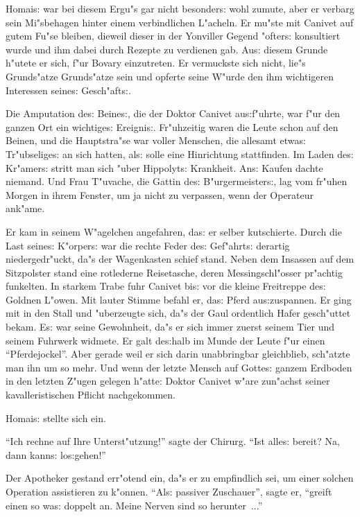 \documentclass[oneside,12pt]{book}
\newcommand{\s}{s:}%
\begin{document}
Homai{\s} war bei diesem Ergu"s gar nicht besonder{\s} wohl
zumute, aber er verbarg sein Mi"sbehagen hinter einem
verbindlichen L"acheln. Er mu"ste mit Canivet auf gutem Fu"se
bleiben, dieweil dieser in der Yonviller Gegend "ofter{\s}
konsultiert wurde und ihm dabei durch Rezepte zu verdienen gab.
Au{\s} diesem Grunde h"utete er sich, f"ur Bovary einzutreten. Er
vermuckste sich nicht, lie"s Grunds"atze Grunds"atze sein und
opferte seine W"urde den ihm wichtigeren Interessen seine{\s}
Gesch"aft{\s}.

Die Amputation de{\s} Beine{\s}, die der Doktor Canivet
au{\s}f"uhrte, war f"ur den ganzen Ort ein wichtige{\s}
Ereigni{\s}. Fr"uhzeitig waren die Leute schon auf den Beinen, und
die Hauptstra"se war voller Menschen, die allesamt etwa{\s}
Tr"ubselige{\s} an sich hatten, al{\s} solle eine Hinrichtung
stattfinden. Im Laden de{\s} Kr"amer{\s} stritt man sich "uber
Hippolyt{\s} Krankheit. An{\s} Kaufen dachte niemand. Und Frau
T"uvache, die Gattin de{\s} B"urgermeister{\s}, lag vom fr"uhen
Morgen in ihrem Fenster, um ja nicht zu verpassen, wenn der
Operateur ank"ame.

Er kam in seinem W"agelchen angefahren, da{\s} er selber
kutschierte. Durch die Last seine{\s} K"orper{\s} war die rechte
Feder de{\s} Gef"ahrt{\s} derartig niedergedr"uckt, da"s der
Wagenkasten schief stand. Neben dem Insassen auf dem Sitzpolster
stand eine rotlederne Reisetasche, deren Messingschl"osser
pr"achtig funkelten. In starkem Trabe fuhr Canivet bi{\s} vor die
kleine Freitreppe de{\s} Goldnen L"owen. Mit lauter Stimme befahl
er, da{\s} Pferd au{\s}zuspannen. Er ging mit in den Stall und
"uberzeugte sich, da"s der Gaul ordentlich Hafer gesch"uttet
bekam. E{\s} war seine Gewohnheit, da"s er sich immer zuerst
seinem Tier und seinem Fuhrwerk widmete. Er galt de{\s}halb im
Munde der Leute f"ur einen "`Pferdejockel"'. Aber gerade weil er
sich darin unabbringbar gleichblieb, sch"atzte man ihn um so mehr.
Und wenn der letzte Mensch auf Gotte{\s} ganzem Erdboden in den
letzten Z"ugen gelegen h"atte: Doktor Canivet w"are zun"achst
seiner kavalleristischen Pflicht nachgekommen.

Homai{\s} stellte sich ein.

"`Ich rechne auf Ihre Unterst"utzung!"' sagte der Chirurg. "`Ist
alle{\s} bereit? Na, dann kann{\s} lo{\s}gehen!"'

Der Apotheker gestand err"otend ein, da"s er zu empfindlich sei,
um einer solchen Operation assistieren zu k"onnen. "`Al{\s}
passiver Zuschauer"', sagte er, "`greift einen so wa{\s} doppelt
an. Meine Nerven sind so herunter~..."'
\end{document}
